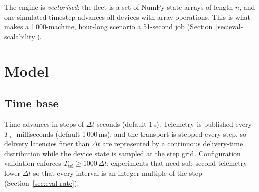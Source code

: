 \documentclass[preprint,12pt,authoryear,nopreprintline]{elsarticle}
\begin{document}
The engine is \emph{vectorised}: the fleet is a set of NumPy state arrays of
length $n$, and one simulated timestep advances all devices with array
operations. This is what makes a 1\,000-machine, hour-long scenario a
51-second job (Section~\ref{sec:eval-scalability}).

\section{Model}
\label{sec:model}

\subsection{Time base}
Time advances in steps of $\Delta t$ seconds (default 1\,s).
Telemetry is published every $T_{\mathrm{tel}}$ milliseconds (default
1\,000\,ms), and the transport is stepped every step, so delivery latencies
finer than $\Delta t$ are represented by a continuous delivery-time distribution
while the device state is sampled at the step grid.
Configuration validation enforces $T_{\mathrm{tel}} \ge 1000\,\Delta t$;
experiments that need sub-second telemetry lower $\Delta t$ so that every
interval is an integer multiple of the step (Section~\ref{sec:eval-rate}).
\end{document}
